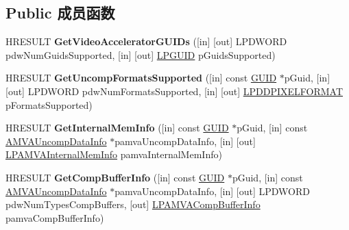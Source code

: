 \subsection*{Public 成员函数}
\begin{DoxyCompactItemize}
\item 
\mbox{\label{interface_i_a_m_video_accelerator_a011b67c6a19b116a0fd7938fc01738d5}} 
H\+R\+E\+S\+U\+LT {\bfseries Get\+Video\+Accelerator\+G\+U\+I\+Ds} (\mbox{[}in\mbox{]} \mbox{[}out\mbox{]} L\+P\+D\+W\+O\+RD pdw\+Num\+Guids\+Supported, \mbox{[}in\mbox{]} \mbox{[}out\mbox{]} \hyperlink{interface_g_u_i_d}{L\+P\+G\+U\+ID} p\+Guids\+Supported)
\item 
\mbox{\label{interface_i_a_m_video_accelerator_a77fb593a08e17fa54820e2b16ad098f5}} 
H\+R\+E\+S\+U\+LT {\bfseries Get\+Uncomp\+Formats\+Supported} (\mbox{[}in\mbox{]} const \hyperlink{interface_g_u_i_d}{G\+U\+ID} $\ast$p\+Guid, \mbox{[}in\mbox{]} \mbox{[}out\mbox{]} L\+P\+D\+W\+O\+RD pdw\+Num\+Formats\+Supported, \mbox{[}in\mbox{]} \mbox{[}out\mbox{]} \hyperlink{interfacevoid}{L\+P\+D\+D\+P\+I\+X\+E\+L\+F\+O\+R\+M\+AT} p\+Formats\+Supported)
\item 
\mbox{\label{interface_i_a_m_video_accelerator_a74bcf31fbed8454e92141e74e8bd102e}} 
H\+R\+E\+S\+U\+LT {\bfseries Get\+Internal\+Mem\+Info} (\mbox{[}in\mbox{]} const \hyperlink{interface_g_u_i_d}{G\+U\+ID} $\ast$p\+Guid, \mbox{[}in\mbox{]} const \hyperlink{struct__tag___a_m_v_a_uncomp_data_info}{A\+M\+V\+A\+Uncomp\+Data\+Info} $\ast$pamva\+Uncomp\+Data\+Info, \mbox{[}in\mbox{]} \mbox{[}out\mbox{]} \hyperlink{struct__tag___a_m_v_a_internal_mem_info}{L\+P\+A\+M\+V\+A\+Internal\+Mem\+Info} pamva\+Internal\+Mem\+Info)
\item 
\mbox{\label{interface_i_a_m_video_accelerator_a8e9e017822d8c6624554bbe66a799a47}} 
H\+R\+E\+S\+U\+LT {\bfseries Get\+Comp\+Buffer\+Info} (\mbox{[}in\mbox{]} const \hyperlink{interface_g_u_i_d}{G\+U\+ID} $\ast$p\+Guid, \mbox{[}in\mbox{]} const \hyperlink{struct__tag___a_m_v_a_uncomp_data_info}{A\+M\+V\+A\+Uncomp\+Data\+Info} $\ast$pamva\+Uncomp\+Data\+Info, \mbox{[}in\mbox{]} \mbox{[}out\mbox{]} L\+P\+D\+W\+O\+RD pdw\+Num\+Types\+Comp\+Buffers, \mbox{[}out\mbox{]} \hyperlink{struct__tag___a_m_v_a_comp_buffer_info}{L\+P\+A\+M\+V\+A\+Comp\+Buffer\+Info} pamva\+Comp\+Buffer\+Info)

\end{DoxyCompactItemize}
